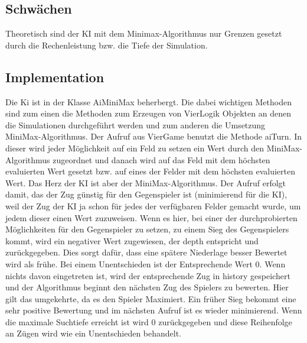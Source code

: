 \documentclass[12pt,a4paper,ngerman]{article}
\begin{document}
	\subsection{Schwächen}
	Theoretisch sind der KI mit dem Minimax-Algorithmus nur Grenzen gesetzt durch die Rechenleistung bzw. die Tiefe der Simulation.
	
	\subsection{Implementation}
	Die Ki ist in der Klasse AiMiniMax beherbergt. Die dabei wichtigen Methoden sind zum einen die Methoden zum Erzeugen von VierLogik Objekten an denen die Simulationen durchgeführt werden und zum anderen die Umsetzung MiniMax-Algorithmus. Der Aufruf aus VierGame benutzt die Methode aiTurn. In dieser wird jeder Möglichkeit auf ein Feld zu setzen ein Wert durch den MiniMax-Algorithmus zugeordnet und danach wird auf das Feld mit dem höchsten evaluierten Wert gesetzt bzw. auf eines der Felder mit dem höchsten evaluierten Wert. Das Herz der KI ist aber der MiniMax-Algorithmus. Der Aufruf erfolgt damit, das der Zug günstig für den Gegenspieler ist (minimierend für die KI), weil der Zug der KI ja schon für jedes der verfügbaren Felder gemacht wurde, um jedem dieser einen Wert zuzuweisen. Wenn es hier, bei einer der durchprobierten Möglichkeiten für den Gegenspieler zu setzen,  zu einem Sieg des Gegenspielers kommt, wird ein negativer Wert zugewiesen, der depth entspricht und zurückgegeben. Dies sorgt dafür, dass eine spätere Niederlage besser Bewertet wird als frühe. Bei einem Unentschieden ist der Entsprechende Wert 0. Wenn nichts davon eingetreten ist, wird der entsprechende Zug in history gespeichert und der Algorithmus beginnt den nächsten Zug des Spielers zu bewerten. Hier gilt das umgekehrte, da es den Spieler Maximiert. Ein früher Sieg bekommt eine sehr positive Bewertung und im nächsten Aufruf ist es wieder minimierend. Wenn die maximale Suchtiefe erreicht ist wird 0 zurückgegeben und diese Reihenfolge an Zügen wird wie ein Unentschieden behandelt.
	
\end{document}
